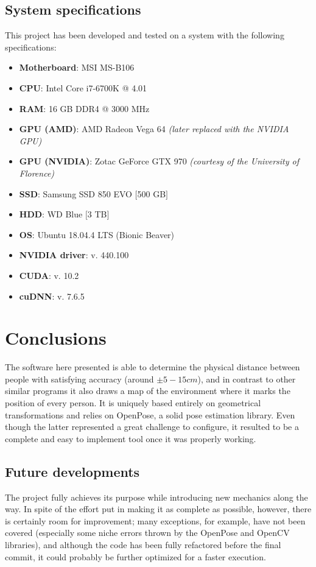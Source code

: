 \documentclass[12pt]{article}
\begin{document}

\subsection{System specifications}
\label{chap:specs}
This project has been developed and tested on a system with the following specifications:
\begin{itemize}
    \item \textbf{Motherboard}: MSI MS-B106
    \item \textbf{CPU}:  Intel Core i7-6700K @ 4.01
    \item \textbf{RAM}: 16 GB DDR4 @ 3000 MHz
    \item \textbf{GPU (AMD)}: AMD Radeon Vega 64 \textit{(later replaced with the NVIDIA GPU)}
    \item \textbf{GPU (NVIDIA)}: Zotac GeForce GTX 970 \textit{(courtesy of the University of Florence)}
    \item \textbf{SSD}: Samsung SSD 850 EVO $[$500 GB$]$
    \item \textbf{HDD}: WD Blue $[$3 TB$]$
    \item \textbf{OS}: Ubuntu 18.04.4 LTS (Bionic Beaver)
    \item \textbf{NVIDIA driver}: v. 440.100
    \item \textbf{CUDA}: v. 10.2
    \item \textbf{cuDNN}: v. 7.6.5
\end{itemize}


\section{Conclusions}
\label{chap:conclusions}
The software here presented is able to determine the physical distance between people with satisfying accuracy (around $\pm 5-15 cm$), and in contrast to other similar programs\cite{others} it also draws a map of the environment where it marks the position of every person. It is uniquely based entirely on geometrical transformations and relies on OpenPose, a solid pose estimation library. Even though the latter represented a great challenge to configure, it resulted to be a complete and easy to implement tool once it was properly working.


\subsection{Future developments}
\label{chap:future}
The project fully achieves its purpose while introducing new mechanics along the way. In spite of the effort put in making it as complete as possible, however, there is certainly room for improvement; many exceptions, for example, have not been covered (especially some niche errors thrown by the OpenPose and OpenCV libraries), and although the code has been fully refactored before the final commit, it could probably be further optimized for a faster execution.
\end{document}
